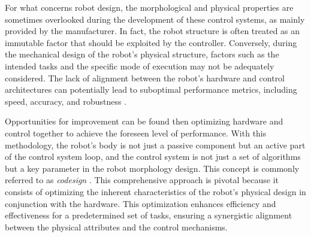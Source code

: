 For what concerns robot design, the morphological and physical properties are sometimes overlooked during the development of these control systems, as mainly provided by the manufacturer. In fact, the robot structure is often treated as an immutable factor that should be exploited by the controller. Conversely, during the mechanical design of the robot's physical structure, factors such as the intended tasks and the specific mode of execution may not be adequately considered. The lack of alignment between the robot's hardware and control architectures can potentially lead to suboptimal performance metrics, including speed, accuracy, and robustness \citep{sorokin_designing_2023}.

Opportunities for improvement can be found then optimizing hardware and control together to achieve the foreseen level of performance. With this methodology, the robot's body is not just a passive component but an active part of the control system loop, and the control system is not just a set of algorithms but a key parameter in the robot morphology design. This concept is commonly referred to as \textit{codesign} \citep{allison_2014}. This comprehensive approach is pivotal because it consists of optimizing the inherent characteristics of the robot's physical design in conjunction with the hardware. This optimization enhances efficiency and effectiveness for a predetermined set of tasks, ensuring a synergistic alignment between the physical attributes and the control mechanisms.
